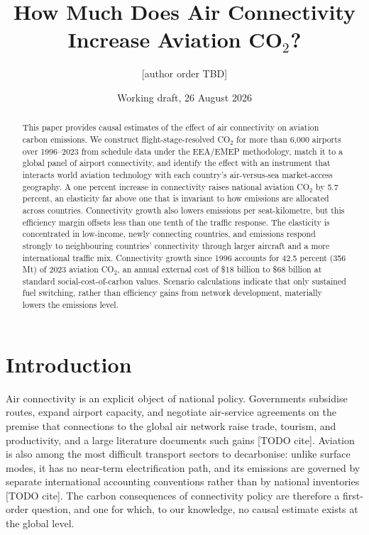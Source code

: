 \documentclass[12pt]{article}
\title{How Much Does Air Connectivity Increase Aviation CO$_2$?}
\author{[author order TBD]}
\date{Working draft, 26 August 2026}
\begin{document}
\maketitle

\begin{abstract}
\noindent This paper provides causal estimates of the effect of air
connectivity on aviation carbon emissions. We construct flight-stage-resolved
CO$_2$ for more than 6{,}000 airports over 1996--2023 from schedule data
under the EEA/EMEP methodology, match it to a global panel of airport
connectivity, and identify the effect with an instrument that interacts world
aviation technology with each country's air-versus-sea market-access
geography. A one percent increase in connectivity raises national aviation
CO$_2$ by 5.7 percent, an elasticity far above one that is invariant to how
emissions are allocated across countries. Connectivity growth also lowers
emissions per seat-kilometre, but this efficiency margin offsets less than
one tenth of the traffic response. The elasticity is concentrated in
low-income, newly connecting countries, and emissions respond strongly to
neighbouring countries' connectivity through larger aircraft and a more
international traffic mix. Connectivity growth since 1996 accounts for 42.5
percent (356 Mt) of 2023 aviation CO$_2$, an annual external cost of \$18
billion to \$68 billion at standard social-cost-of-carbon values. Scenario
calculations indicate that only sustained fuel switching, rather than
efficiency gains from network development, materially lowers the emissions
level.
\end{abstract}

\section{Introduction}
Air connectivity is an explicit object of national policy. Governments
subsidise routes, expand airport capacity, and negotiate air-service
agreements on the premise that connections to the global air network raise
trade, tourism, and productivity, and a large literature documents such
gains [TODO cite]. Aviation is also among the most difficult transport
sectors to decarbonise: unlike surface modes, it has no near-term
electrification path, and its emissions are governed by separate
international accounting conventions rather than by national inventories
[TODO cite]. The carbon consequences of connectivity policy are therefore a
first-order question, and one for which, to our knowledge, no causal
estimate exists at the global level.
\end{document}
